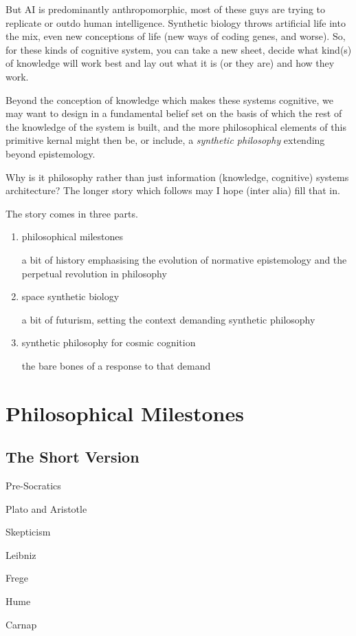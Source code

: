 \documentclass[14pt,titlepage]{extarticle}
\begin{document}
But AI is predominantly anthropomorphic, most of these guys are trying to replicate or outdo human intelligence.
Synthetic biology throws artificial life into the mix, even new conceptions of life (new ways of coding genes, and worse).
So, for these kinds of cognitive system, you can take a new sheet, decide what kind(s) of knowledge will work best and lay out what it is (or they are) and how they work.

Beyond the conception of knowledge which makes these systems cognitive, we may want to design in a fundamental belief set on the basis of which the rest of the knowledge of the system is built, and the more philosophical elements of this primitive kernal might then be, or include, a {\it synthetic philosophy} extending beyond epistemology.

Why is it philosophy rather than just information (knowledge, cognitive) systems architecture?
The longer story which follows may I hope (inter alia) fill that in.

The story comes in three parts.
\begin{enumerate}
\item philosophical milestones

  a bit of history emphasising the evolution of normative epistemology and the perpetual revolution in philosophy
  
\item space synthetic biology

  a bit of futurism, setting the context demanding synthetic philosophy
  
\item synthetic philosophy for cosmic cognition

  the bare bones of a response to that demand

\end{enumerate}

\section{Philosophical Milestones}

\subsection{The Short Version}



\begin{description}
\item Pre-Socratics
\item Plato and Aristotle
\item Skepticism
\item Leibniz
\item Frege
\item Hume
\item Carnap
\end{description}
\end{document}
